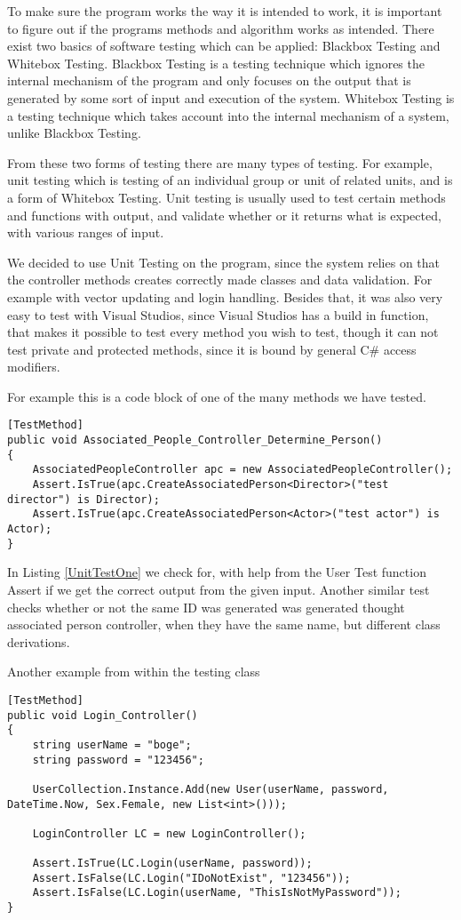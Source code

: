 To make sure the program works the way it is intended to work, it is important to figure out if the programs methods and algorithm works as intended. There exist two basics of software testing which can be applied: Blackbox Testing and Whitebox Testing. Blackbox Testing is a testing technique which ignores the internal mechanism of the program and only focuses on the output that is generated by some sort of input and execution of the system. Whitebox Testing is a testing technique which takes account into the internal mechanism of a system, unlike Blackbox Testing.

From these two forms of testing there are many types of testing. For example, unit testing which is testing of an individual group or unit of related units, and is a form of Whitebox Testing. Unit testing is usually used to test certain methods and functions with output, and validate whether or it returns what is expected, with various ranges of input. \cite{Testing}

We decided to use Unit Testing on the program, since the system relies on that the controller methods creates correctly made classes and data validation. For example with vector updating and login handling. Besides that, it was also very easy to test with Visual Studios, since Visual Studios has a build in function, that makes it possible to test every method you wish to test, though it can not test private and protected methods, since it is bound by general C# access modifiers.

For example this is a code block of one of the many methods we have tested.

\begin{lstlisting}[caption={A unit test which tests the associated person controller},label={UnitTestOne}]
[TestMethod]
public void Associated_People_Controller_Determine_Person()
{
	AssociatedPeopleController apc = new AssociatedPeopleController();
	Assert.IsTrue(apc.CreateAssociatedPerson<Director>("test director") is Director);
	Assert.IsTrue(apc.CreateAssociatedPerson<Actor>("test actor") is Actor);
}
\end{lstlisting}

In Listing \ref{UnitTestOne} we check for, with help from the User Test function Assert if we get the correct output from the given input. Another similar test checks whether or not the same ID was generated was generated thought associated person controller, when they have the same name, but different class derivations.

Another example from within the testing class
\begin{lstlisting}[caption={A unit test which tests the login controller},label={UnitTestTwo}]
[TestMethod] 
public void Login_Controller()
{
	string userName = "boge";
	string password = "123456";

	UserCollection.Instance.Add(new User(userName, password, DateTime.Now, Sex.Female, new List<int>()));

	LoginController LC = new LoginController();

	Assert.IsTrue(LC.Login(userName, password));
	Assert.IsFalse(LC.Login("IDoNotExist", "123456"));
	Assert.IsFalse(LC.Login(userName, "ThisIsNotMyPassword"));
}
\end{lstlisting}


